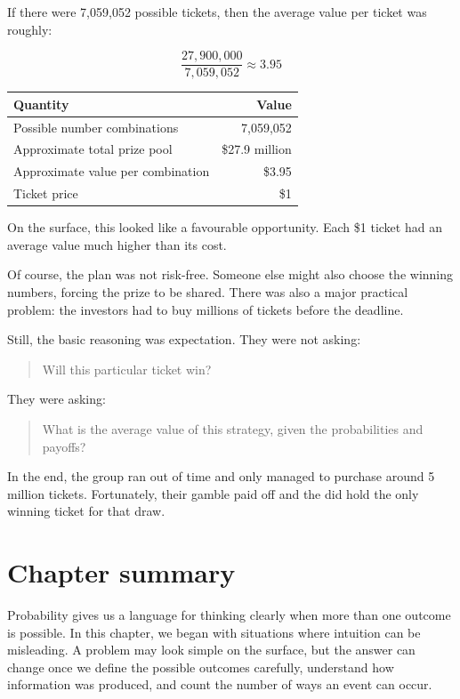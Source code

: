 \documentclass[
  letterpaper,
  DIV=11,
  numbers=noendperiod]{scrreprt}
\begin{document}
If there were 7,059,052 possible tickets, then the average value per
ticket was roughly:

\[
\frac{27,900,000}{7,059,052}
\approx 3.95
\]

\begin{table}
\fontsize{12.0pt}{14.0pt}\selectfont
\begin{tabular*}{\linewidth}{@{\extracolsep{\fill}}lr}
\toprule
Quantity & Value \\ 
\midrule\addlinespace[2.5pt]
Possible number combinations & 7,059,052 \\ 
Approximate total prize pool & \$27.9 million \\ 
Approximate value per combination & \$3.95 \\ 
Ticket price & \$1 \\ 
\bottomrule
\end{tabular*}
\end{table}

On the surface, this looked like a favourable opportunity. Each \$1
ticket had an average value much higher than its cost.

Of course, the plan was not risk-free. Someone else might also choose
the winning numbers, forcing the prize to be shared. There was also a
major practical problem: the investors had to buy millions of tickets
before the deadline.

Still, the basic reasoning was expectation. They were not asking:

\begin{quote}
Will this particular ticket win?
\end{quote}

They were asking:

\begin{quote}
What is the average value of this strategy, given the probabilities and
payoffs?
\end{quote}

In the end, the group ran out of time and only managed to purchase
around 5 million tickets. Fortunately, their gamble paid off and the did
hold the only winning ticket for that draw.

\section{Chapter summary}\label{chapter-summary}

Probability gives us a language for thinking clearly when more than one
outcome is possible. In this chapter, we began with situations where
intuition can be misleading. A problem may look simple on the surface,
but the answer can change once we define the possible outcomes
carefully, understand how information was produced, and count the number
of ways an event can occur.
\end{document}
